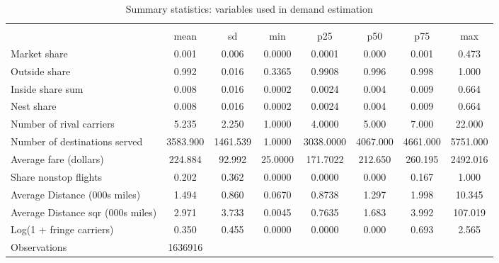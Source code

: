 \begin{table}[htbp]\centering
\def\sym#1{\ifmmode^{#1}\else\(^{#1}\)\fi}
\caption{Summary statistics: variables used in demand estimation}
\begin{tabular}{l*{1}{ccccccc}}
\toprule
                    &\multicolumn{7}{c}{}                                                                      \\
                    &        mean&          sd&         min&         p25&         p50&         p75&         max\\
\midrule
Market share        &       0.001&       0.006&      0.0000&      0.0001&       0.000&       0.001&       0.473\\
Outside share       &       0.992&       0.016&      0.3365&      0.9908&       0.996&       0.998&       1.000\\
Inside share sum    &       0.008&       0.016&      0.0002&      0.0024&       0.004&       0.009&       0.664\\
Nest share          &       0.008&       0.016&      0.0002&      0.0024&       0.004&       0.009&       0.664\\
Number of rival carriers&       5.235&       2.250&      1.0000&      4.0000&       5.000&       7.000&      22.000\\
Number of destinations served&    3583.900&    1461.539&      1.0000&   3038.0000&    4067.000&    4661.000&    5751.000\\
Average fare (dollars)&     224.884&      92.992&     25.0000&    171.7022&     212.650&     260.195&    2492.016\\
Share nonstop flights &       0.202&       0.362&      0.0000&      0.0000&       0.000&       0.167&       1.000\\
Average Distance (000s miles)&       1.494&       0.860&      0.0670&      0.8738&       1.297&       1.998&      10.345\\
Average Distance sqr (000s miles)&       2.971&       3.733&      0.0045&      0.7635&       1.683&       3.992&     107.019\\
Log(1 + fringe carriers)&       0.350&       0.455&      0.0000&      0.0000&       0.000&       0.693&       2.565\\
\midrule
Observations        &     1636916&            &            &            &            &            &            \\
\bottomrule
\end{tabular}
\end{table}
